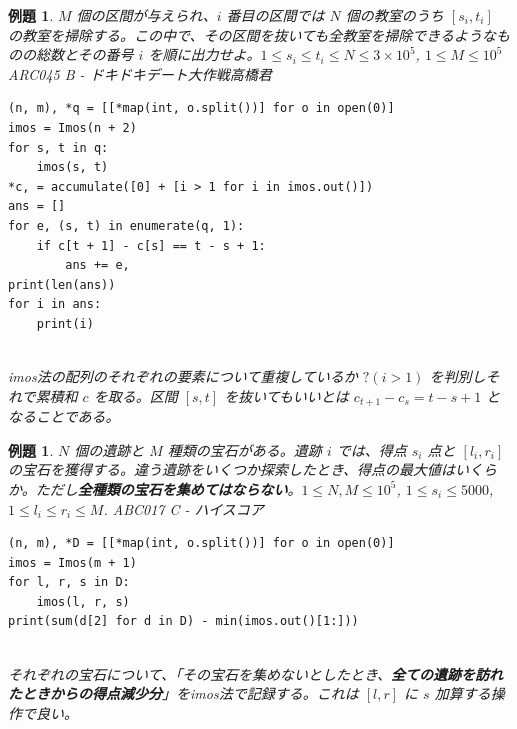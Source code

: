 \documentclass[12pt, a4j]{ltjsarticle}
\newtheorem{exm}[thm]{例題}
\begin{document}
\vspace{1cm}

\begin{exm} $M$ 個の区間が与えられ、$i$ 番目の区間では $N$ 個の教室のうち $[s_i,t_i]$ の教室を掃除する。この中で、その区間を抜いても全教室を掃除できるようなものの総数とその番号 $i$ を順に出力せよ。$1\le s_i \le t_i\le N \le 3\times10^5$, $1\le M\le 10^5$\quad \upshape ARC045 B - ドキドキデート大作戦高橋君\\
\begin{lstlisting}
(n, m), *q = [[*map(int, o.split())] for o in open(0)]
imos = Imos(n + 2)
for s, t in q:
    imos(s, t)
*c, = accumulate([0] + [i > 1 for i in imos.out()])
ans = []
for e, (s, t) in enumerate(q, 1):
    if c[t + 1] - c[s] == t - s + 1:
        ans += e,
print(len(ans))
for i in ans:
    print(i)
\end{lstlisting}
\quad\\
imos法の配列のそれぞれの要素について重複しているか $?(i > 1)$ を判別しそれで累積和 $c$ を取る。区間 $[s,t]$ を抜いてもいいとは $c_{t+1} - c_s = t - s + 1$ となることである。
\end{exm}

\vspace{1cm}

\begin{exm}
$N$ 個の遺跡と $M$ 種類の宝石がある。遺跡 $i$ では、得点 $s_i$ 点と $[l_i,r_i]$ の宝石を獲得する。違う遺跡をいくつか探索したとき、得点の最大値はいくらか。ただし{\bf 全種類の宝石を集めてはならない}。$1\le N,M\le 10^5$, $1\le s_i\le 5000$, $1\le l_i \le r_i \le M$. \quad\upshape ABC017 C - ハイスコア\\
\begin{lstlisting}
(n, m), *D = [[*map(int, o.split())] for o in open(0)]
imos = Imos(m + 1)
for l, r, s in D:
    imos(l, r, s)
print(sum(d[2] for d in D) - min(imos.out()[1:]))
\end{lstlisting}\quad\\
それぞれの宝石について、「その宝石を集めないとしたとき、{\bf 全ての遺跡を訪れたときからの得点減少分}」をimos法で記録する。これは $[l,r]$ に $s$ 加算する操作で良い。
\end{exm}

\newpage
\end{document}
